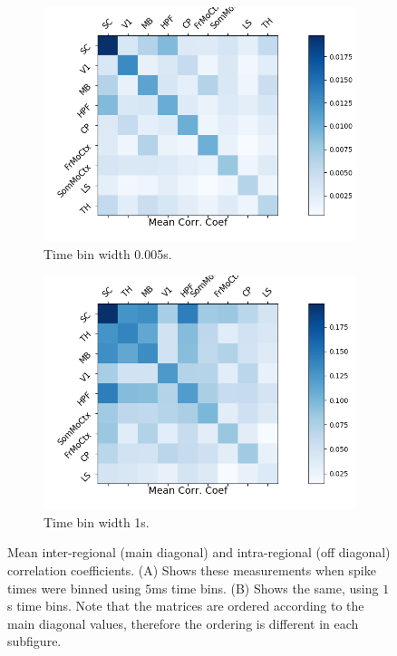   \begin{figure}[h]
    \begin{subfigure}[h]{0.5\linewidth}
      \centering
      \includegraphics[width=\linewidth]{figures/eight_probe/Krebs_0p005_corr_matrix.png}
      \caption{Time bin width 0.005s.}
      \label{fig:short_bin_corr_matrix}
    \end{subfigure}
    \begin{subfigure}[h]{0.5\linewidth}
      \centering
      \includegraphics[width=\linewidth]{figures/eight_probe/Krebs_1p0_corr_matrix.png}
      \caption{Time bin width 1s.}
      \label{fig:long_bin_corr_matrix}
    \end{subfigure}
    \caption{Mean inter-regional (main diagonal) and intra-regional (off diagonal) correlation coefficients. (A) Shows these measurements when spike times were binned using $5$ms time bins. (B) Shows the same, using $1$s time bins. Note that the matrices are ordered according to the main diagonal values, therefore the ordering is different in each subfigure.}
    \label{fig:corr_matrices}
  \end{figure}

